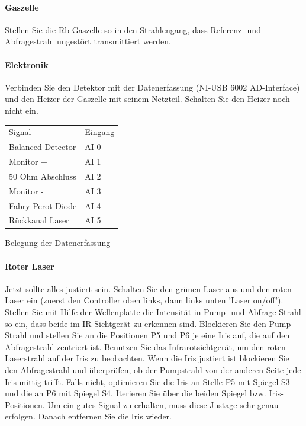 \paragraph{Gaszelle} Stellen Sie die Rb Gaszelle so in den Strahlengang, dass Referenz- und Abfragestrahl ungestört transmittiert werden.


\paragraph*{Elektronik} Verbinden Sie den Detektor  mit der Datenerfassung (NI-USB 6002 AD-Interface) und den Heizer der Gaszelle mit seinem Netzteil. Schalten Sie den Heizer noch nicht ein.

\begin{margintable}
    \begin{tabular}{ll}
        Signal & Eingang \\
        Balanced Detector & AI 0 \\
        Monitor + & AI 1 \\
        50 Ohm Abschluss & AI 2 \\
        Monitor - & AI 3 \\
        Fabry-Perot-Diode & AI 4 \\
        Rückkanal Laser & AI 5
    \end{tabular}
    \caption{Belegung der Datenerfassung}
\end{margintable}

\paragraph*{Roter Laser} Jetzt sollte alles justiert sein. Schalten Sie den grünen Laser aus und  den roten Laser ein (zuerst den Controller oben links, dann links unten 'Laser on/off'). Stellen Sie mit Hilfe der Wellenplatte die Intensität in Pump- und Abfrage-Strahl so ein, dass beide im IR-Sichtgerät zu erkennen sind. Blockieren Sie den Pump-Strahl und stellen Sie an die Positionen P5 und P6 je eine Iris auf, die auf den Abfragestrahl zentriert ist. Benutzen Sie das Infrarotsichtgerät, um den roten Laserstrahl auf der Iris zu beobachten. Wenn die Iris justiert ist blockieren Sie  den Abfragestrahl und überprüfen, ob der Pumpstrahl von der anderen Seite jede Iris mittig trifft. Falls nicht, optimieren Sie die Iris an Stelle P5 mit Spiegel S3 und die an P6 mit Spiegel S4. Iterieren Sie über die beiden Spiegel bzw. Iris-Positionen. Um ein gutes Signal zu erhalten, muss diese Justage sehr genau erfolgen. Danach entfernen Sie die Iris wieder.


